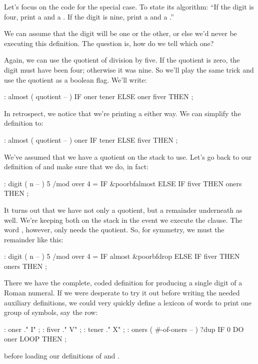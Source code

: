 Let's focus on the code for the special case. To state its algorithm: ``If
the digit is four, print a  and a . If the digit
is nine, print a  and a .''

We can assume that the digit will be one or the other, or else we'd never
be executing this definition. The question is, how do we tell which one?

Again, we can use the quotient of division by five. If the quotient is
zero, the digit must have been four; otherwise it was nine. So we'll play
the same trick and use the quotient as a boolean flag. We'll write:

\begin{Code}
: almost  ( quotient -- )
     IF  oner tener  ELSE  oner fiver  THEN ;
\end{Code}
In retrospect, we notice that we're printing a  either way. We
can simplify the definition to:

\begin{Code}
: almost  ( quotient -- )
     oner  IF  tener  ELSE  fiver  THEN ;
\end{Code}
We've assumed that we have a quotient on the stack to use. Let's go back
to our definition of  and make sure that we do, in fact:

\begin{Code}[commandchars=\&\{\}]
: digit  ( n -- )
     5 /mod  over 4 =  IF  &poorbf{almost}  ELSE
     IF  fiver  THEN  oners  THEN ;
\end{Code}
It turns out that we have not only a quotient, but a remainder underneath
as well. We're keeping both on the stack in the event we execute the
 clause. The word , however, only needs the
quotient. So, for symmetry, we must  the remainder like this:

\begin{Code}[commandchars=\&\{\}]
: digit  ( n -- )
     5 /mod  over 4 =  IF  almost  &poorbf{drop}  ELSE
     IF  fiver  THEN  oners  THEN ;
\end{Code}
There we have the complete, coded definition for producing a single digit
of a Roman numeral. If we were desperate to try it out before writing the
needed auxiliary definitions, we could very quickly define a lexicon of
words to print one group of symbols, say the  row:

\begin{Code}
: oner    ." I" ;
: fiver   ." V" ;
: tener   ." X" ;
: oners  ( #-of-oners -- )
     ?dup IF  0 DO  oner  LOOP  THEN ;
\end{Code}
before loading our definitions of  and .


